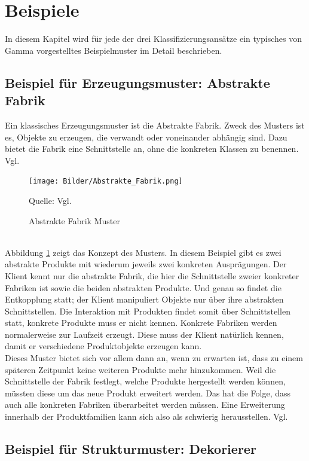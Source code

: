 \documentclass[fontsize=11pt,a4paper,final]{scrreprt}[2003/01/01]
\newcommand*{\quelle}{%
	\footnotesize Quelle: 
}
\begin{document}
\section{Beispiele}
In diesem Kapitel wird für jede der drei Klassifizierungsansätze ein typisches von \mbox{Gamma} vorgestelltes Beispielmuster im Detail beschrieben.

\subsection{Beispiel für Erzeugungsmuster: Abstrakte Fabrik}

Ein klassisches Erzeugungsmuster ist die Abstrakte Fabrik. Zweck des Musters ist es, Objekte zu erzeugen, die verwandt oder voneinander abhängig sind. Dazu bietet die Fabrik eine Schnittstelle an, ohne die konkreten Klassen zu benennen. Vgl. \cite[S. 107]{gamma2004}

\begin{figure}[H]
	\centering
	\texttt{[image: Bilder/Abstrakte\_Fabrik.png]}
	\caption{Abstrakte Fabrik Muster}
	\quelle{ Vgl. \cite[S. 109]{gamma2004}}
	\label{fig:Abstrakte_Fabrik}
\end{figure}
\ \\
Abbildung \ref{fig:Abstrakte_Fabrik} zeigt das Konzept des Musters. In diesem Beispiel gibt es zwei abstrakte Produkte mit wiederum jeweils zwei konkreten Ausprägungen. Der Klient kennt nur die abstrakte Fabrik, die hier die Schnittstelle zweier konkreter Fabriken ist sowie die beiden abstrakten Produkte. Und genau so findet die Entkopplung statt; der Klient manipuliert Objekte nur über ihre abstrakten Schnittstellen. Die Interaktion mit Produkten findet somit über Schnittstellen statt, konkrete Produkte muss er nicht kennen. Konkrete Fabriken werden normalerweise zur Laufzeit erzeugt. Diese muss der Klient natürlich kennen, damit er verschiedene Produktobjekte erzeugen kann. \\
Dieses Muster bietet sich vor allem dann an, wenn zu erwarten ist, dass zu einem späteren Zeitpunkt keine weiteren Produkte mehr hinzukommen. Weil die Schnittstelle der Fabrik festlegt, welche Produkte hergestellt werden können, müssten diese um das neue Produkt erweitert werden. Das hat die Folge, dass auch alle konkreten Fabriken überarbeitet werden müssen. Eine Erweiterung innerhalb der Produktfamilien kann sich also als schwierig herausstellen. Vgl. \cite[S. 109-111]{gamma2004}

\subsection{Beispiel für Strukturmuster: Dekorierer}
\end{document}
